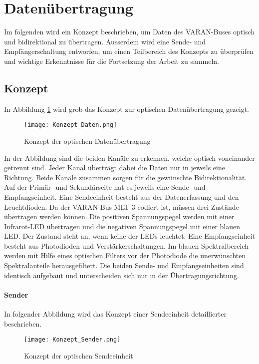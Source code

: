 \section{Datenübertragung}
\label{sec:Daten}
Im folgenden wird ein Konzept beschrieben, um Daten des VARAN-Buses optisch und bidirektional zu übertragen. Ausserdem wird eine Sende- und Empfängerschaltung entworfen, um einen Teilbereich des Konzepts zu überprüfen und wichtige Erkenntnisse für die Fortsetzung der Arbeit zu sammeln.  
\subsection{Konzept}
In Abbildung \ref{fig:Konzept_Daten} wird grob das Konzept zur optischen Datenübertragung gezeigt.

\begin{figure}[h]
	\centering
	\texttt{[image: Konzept\_Daten.png]}
	\caption{Konzept der optischen Datenübertragung}\label{fig:Konzept_Daten}
\end{figure}

In der Abbildung sind die beiden Kanäle zu erkennen, welche optisch voneinander getrennt sind. Jeder Kanal überträgt dabei die Daten nur in jeweils eine Richtung. Beide Kanäle zusammen sorgen für die gewünschte Bidirektionalität. Auf der Primär- und Sekundärseite hat es jeweils eine Sende- und Empfangseinheit. Eine Sendeeinheit besteht aus der Datenerfassung und den Leuchtdioden. Da der VARAN-Bus MLT-3 codiert ist, müssen drei Zustände übertragen werden können. Die positiven Spannungspegel werden mit einer Infrarot-LED übertragen und die negativen Spannungspegel mit einer blauen LED. Der Zustand \grqq steht an, wenn keine der LEDs leuchtet.
\newline
Eine Empfangseinheit besteht aus Photodioden und Verstärkerschaltungen. Im blauen Spektralbereich werden mit Hilfe eines optischen Filters vor der Photodiode die unerwünschten Spektralanteile herausgefiltert.
\newline Die beiden Sende- und Empfangseinheiten sind identisch aufgebaut und unterscheiden sich nur in der Übertragungsrichtung.

\paragraph{Sender}
In folgender Abbildung wird das Konzept einer Sendeeinheit detaillierter beschrieben.
\begin{figure}[h]
	\centering
	\texttt{[image: Konzept\_Sender.png]}
	\caption{Konzept der optischen Sendeeinheit}\label{fig:Konzept_Sender}
\end{figure}
